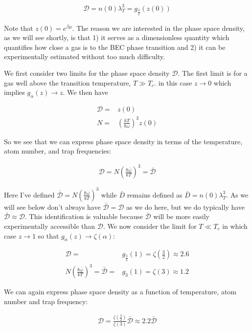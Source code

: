 \documentclass[12pt]{article}
\newcommand{\mc}[1]{\mathcal{#1}}
\begin{document}
\begin{align}
\mc{D} = n(0) \lambda_T^3 = g_{\frac{3}{2}}(z(0))
\end{align}


Note that $z(0) = e^{\beta \mu}$. 
The reason we are interested in the phase space density, as we will see shortly, is that 1) it serves as a dimensionless quantity which quantifies how close a gas is to the BEC phase transition and 2) it can be experimentally estimated without too much difficulty.

We first consider two limits for the phase space density $\mc{D}$.
The first limit is for a gas well above the transition temperature, $T\gg T_c$. in this case $z\rightarrow 0$ which implies $g_{\alpha}(z)\rightarrow z$. 
We then have

\begin{align}
\mc{D} =& z(0)\\
N =& \left(\frac{kT}{\hbar \bar{\omega}}\right)^3 z(0)
\end{align}

So we see that we can express phase space density in terms of the temperature, atom number, and trap frequencies:

\begin{align}
\mc{D} = N \left(\frac{\hbar \bar{\omega}}{kT}\right)^3 = \bar{\mc{D}}
\end{align}

Here I've defined $\bar{\mc{D}} = N\left(\frac{\hbar \bar{\omega}}{kT}\right)^3$ while $\bar{D}$ remains defined as $\bar{D} = n(0) \lambda_T^3$.
As we will see below don't always have $\bar{\mc{D}} = \mc{D}$ as we do here, but we do typically have $\bar{\mc{D}} \approx \mc{D}$.
This identification is valuable because $\bar{\mc{D}}$ will be more easily experimentally accessible than $\mc{D}$.
We now consider the limit for $T\ll T_c$ in which case $z\rightarrow 1$ so that $g_{\alpha}(z)\rightarrow \zeta(\alpha)$:

\begin{align}
\mc{D} =& g_{\frac{3}{2}}(1) = \zeta\left(\frac{3}{2}\right) \approx 2.6\\
N\left(\frac{\hbar \bar{\omega}}{kT}\right)^3 = \bar{\mc{D}}=& g_3(1) = \zeta(3) \approx 1.2
\end{align}

We can again express phase space density as a function of temperature, atom number and trap frequency:

\begin{align}
\mc{D} = \frac{\zeta\left(\frac{3}{2}\right)}{\zeta(3)} \bar{\mc{D}} \approx 2.2 \bar{\mc{D}}
\end{align}
\end{document}
